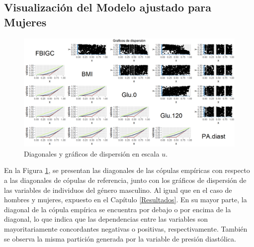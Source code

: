 
\begin{landscape}
\subsection{Visualización del Modelo ajustado para Mujeres}

\begin{figure}[H]
    \centering
    \includegraphics[height = 13.5 cm, width = 1.4 \textwidth]{4img/UdiagM.png}
    \caption{Diagonales y gráficos de dispersión en escala $u$.}
    \label{fig:diagMU}
\end{figure}
\end{landscape}

En la Figura \ref{fig:diagMU}, se presentan las diagonales de las cópulas empíricas con respecto a las diagonales de cópulas de referencia, junto con los gráficos de dispersión de las variables de individuos del género masculino. Al igual que en el caso de hombres y mujeres, expuesto en el Capítulo \ref{Resultados}. En su mayor parte, la diagonal de la cópula empírica se encuentra por debajo o por encima de la diagonal, lo que indica que las dependencias entre las variables son mayoritariamente concordantes negativas o positivas, respectivamente. También se observa la misma partición generada por la variable de presión diastólica.


